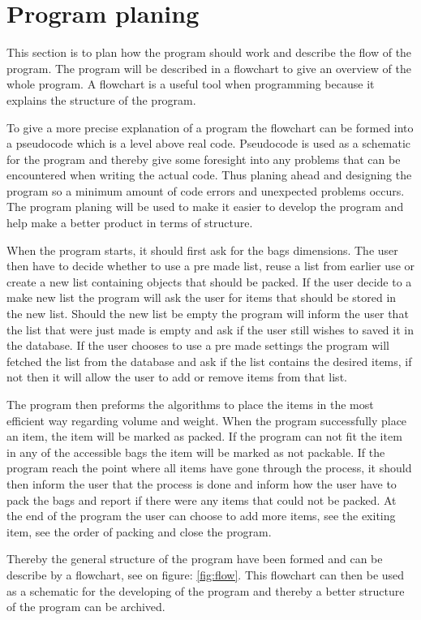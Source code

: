 \section{Program planing}
This section is to plan how the program should work and describe the flow of the program. The program will be described in a flowchart to give an overview of the whole program. A flowchart is a useful tool when programming because it explains the structure of the program.

To give a more precise explanation of a program the flowchart can be formed into a pseudocode which is a level above real code. Pseudocode is used as a schematic for the program and thereby give some foresight into any problems that can be encountered when writing the actual code. Thus planing ahead and designing the program so a minimum amount of code errors and unexpected problems occurs.
The program planing will be used to make it easier to develop the program and help make a better product in terms of structure.

When the program starts, it should first ask for the bags dimensions. The user then have to decide whether to use a pre made list, reuse a list from earlier use or create a new list containing objects that should be packed. If the user decide to a make new list the program will ask the user for items that should be stored in the new list. Should the new list be empty the program will inform the user that the list that were just made is empty and ask if the user still wishes to saved it in the database.
If the user chooses to use a pre made settings the program will fetched the list from the database and ask if the list contains the desired items, if not then it will allow the user to add or remove items from that list.

The program then preforms the algorithms to place the items in the most efficient way regarding volume and weight. When the program successfully place an item, the item will be marked as packed. If the program can not fit the item in any of the accessible bags the item will be marked as not packable. If the program reach the point where all items have gone through the process, it should then inform the user that the process is done and inform how the user have to pack the bags and report if there were any items that could not be packed.
At the end of the program the user can choose to add more items, see the exiting item, see the order of packing and close the program.


Thereby the general structure of the program have been formed and can be describe by a flowchart, see on figure: \ref{fig:flow}.
This flowchart can then be used as a schematic for the developing of the program and thereby a better structure of the program can be archived.